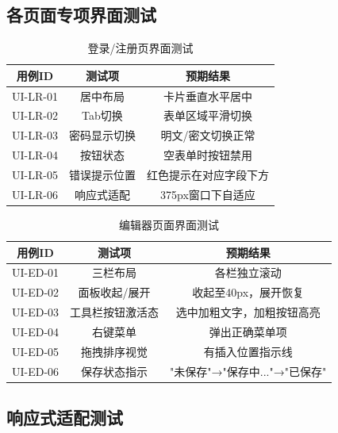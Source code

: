 \subsection{各页面专项界面测试}

\begin{table}[htbp]
    \centering
    \caption{登录/注册页界面测试}
    \begin{tabular}{|c|c|c|}
        \hline
        \textbf{用例ID} & \textbf{测试项} & \textbf{预期结果} \\
        \hline
        UI-LR-01 & 居中布局 & 卡片垂直水平居中 \\
        \hline
        UI-LR-02 & Tab切换 & 表单区域平滑切换 \\
        \hline
        UI-LR-03 & 密码显示切换 & 明文/密文切换正常 \\
        \hline
        UI-LR-04 & 按钮状态 & 空表单时按钮禁用 \\
        \hline
        UI-LR-05 & 错误提示位置 & 红色提示在对应字段下方 \\
        \hline
        UI-LR-06 & 响应式适配 & 375px窗口下自适应 \\
        \hline
    \end{tabular}
\end{table}

\begin{table}[htbp]
    \centering
    \caption{编辑器页面界面测试}
    \begin{tabular}{|c|c|c|}
        \hline
        \textbf{用例ID} & \textbf{测试项} & \textbf{预期结果} \\
        \hline
        UI-ED-01 & 三栏布局 & 各栏独立滚动 \\
        \hline
        UI-ED-02 & 面板收起/展开 & 收起至40px，展开恢复 \\
        \hline
        UI-ED-03 & 工具栏按钮激活态 & 选中加粗文字，加粗按钮高亮 \\
        \hline
        UI-ED-04 & 右键菜单 & 弹出正确菜单项 \\
        \hline
        UI-ED-05 & 拖拽排序视觉 & 有插入位置指示线 \\
        \hline
        UI-ED-06 & 保存状态指示 & "未保存"→"保存中..."→"已保存" \\
        \hline
    \end{tabular}
\end{table}

\subsection{响应式适配测试}

